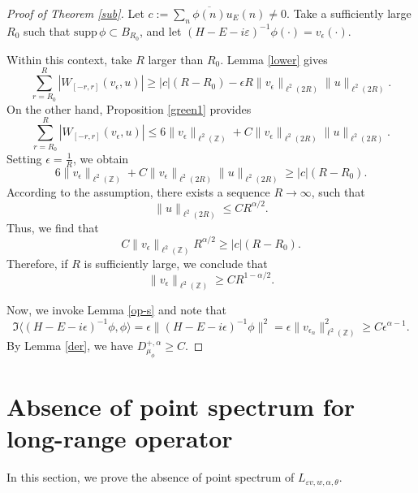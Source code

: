 \documentclass[11pt]{amsart}
\theoremstyle{remark}
\theoremstyle{definition}
\begin{document}
\begin{proof}[Proof of Theorem \ref{sub}] Let $ c := \sum_n \overline{\phi(n)} u_E(n) \neq 0 $. Take a sufficiently large $ R_0 $ such that $ \text{supp} \, \phi \subset B_{R_0} $, and let $ (H-E-i\varepsilon)^{-1} \phi(\cdot) = v_\epsilon(\cdot) $.

Within this context, take $ R $  larger than $ R_0 $. Lemma \ref{lower} gives $$
\sum_{r=R_0}^R \left| W_{[-r,r]}(v_\epsilon, u) \right| \geq |c| (R - R_0) - \epsilon R \|v_\epsilon\|_{\ell^2(2R)} \|u\|_{\ell^2(2R)}.
$$ On the other hand, Proposition \ref{green1} provides $$
\sum_{r=R_0}^R \left| W_{[-r,r]}(v_\epsilon, u) \right| \leq 6 \|v_\epsilon\|_{\ell^2(\mathbb{Z})} + C \|v_\epsilon\|_{\ell^2(2R)} \|u\|_{\ell^2(2R)}.
$$ Setting $ \epsilon = \frac{1}{R} $, we obtain $$
6 \|v_\epsilon\|_{\ell^2(\mathbb{Z})} + C \|v_\epsilon\|_{\ell^2(2R)} \|u\|_{\ell^2(2R)} \geq |c| (R - R_0).
$$ According to the assumption, there exists a sequence $R\rightarrow\infty$, such that $$
\|u\|_{\ell^2(2R)} \leq C R^{\alpha/2}.
$$ Thus, we find that $$
C \|v_\epsilon\|_{\ell^2(\mathbb{Z})} R^{\alpha/2} \geq |c| (R - R_0).
$$ Therefore, if $ R $ is sufficiently large, we conclude that $$
\|v_\epsilon\|_{\ell^2(\mathbb{Z})} \geq C R^{1-\alpha/2}.
$$

Now, we invoke Lemma \ref{op-s} and note that $$
\Im \langle (H-E-i\epsilon)^{-1} \phi, \phi \rangle = \epsilon \|(H-E-i\epsilon)^{-1} \phi\|^2 = \epsilon \|v_{\epsilon_n}\|_{\ell^2(\mathbb{Z})}^2 \geq C\epsilon^{\alpha-1}.
$$ By Lemma \ref{der}, we have $ D^{+,\alpha}_{\mu_{\phi}} \geq C. $ \end{proof}

 


\section{Absence of point spectrum for long-range operator}\label{ab-point}
 	In this section, we prove the absence of point spectrum of  $L_{\varepsilon v,w,\alpha,\theta}$. 
 			
\end{document}
